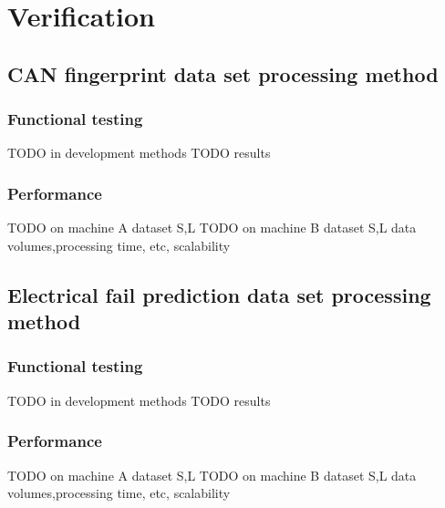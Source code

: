 \chapter{Verification}
\section{CAN fingerprint data set processing method}
\subsection{Functional testing}
TODO in development methods
TODO results

\subsection{Performance}
TODO on machine A dataset S,L
TODO on machine B dataset S,L
	data volumes,processing time, etc, scalability
\section{Electrical fail prediction data set processing method}
\subsection{Functional testing}
TODO in development methods
TODO results
\subsection{Performance}
TODO on machine A dataset S,L
TODO on machine B dataset S,L
	data volumes,processing time, etc, scalability